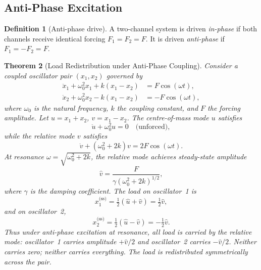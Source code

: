 \documentclass[12pt,a4paper]{article}
\theoremstyle{plain}
\newtheorem{theorem}{Theorem}[section]
\theoremstyle{definition}
\newtheorem{definition}[theorem]{Definition}
\theoremstyle{remark}
\begin{document}
\subsection{Anti-Phase Excitation}

\begin{definition}[Anti-phase drive]
A two-channel system is driven \emph{in-phase} if both channels receive
identical forcing $F_1 = F_2 = F$.  It is driven \emph{anti-phase} if
$F_1 = -F_2 = F$.
\end{definition}

\begin{theorem}[Load Redistribution under Anti-Phase Coupling]
\label{thm:lac}
Consider a coupled oscillator pair $(x_1, x_2)$ governed by
\begin{align}
\ddot x_1 + \omega_0^2 x_1 + k(x_1 - x_2) &= F\cos(\omega t), \\
\ddot x_2 + \omega_0^2 x_2 - k(x_1 - x_2) &= -F\cos(\omega t),
\end{align}
where $\omega_0$ is the natural frequency, $k$ the coupling constant,
and $F$ the forcing amplitude.  Let $u = x_1 + x_2$, $v = x_1 - x_2$.
The centre-of-mass mode $u$ satisfies
\begin{equation}
\ddot u + \omega_0^2 u = 0 \quad\text{(unforced)},
\end{equation}
while the relative mode $v$ satisfies
\begin{equation}
\ddot v + (\omega_0^2 + 2k) v = 2F\cos(\omega t).
\end{equation}
At resonance $\omega = \sqrt{\omega_0^2 + 2k}$, the relative mode
achieves steady-state amplitude
\begin{equation}
\hat v = \frac{F}{\gamma(\omega_0^2 + 2k)^{1/2}},
\end{equation}
where $\gamma$ is the damping coefficient.
The load on oscillator~1 is
\begin{equation}
x_1^{\text{(ss)}} = \tfrac{1}{2}(\hat u + \hat v)
= \tfrac{1}{2}\hat v,
\end{equation}
and on oscillator~2,
\begin{equation}
x_2^{\text{(ss)}} = \tfrac{1}{2}(\hat u - \hat v)
= -\tfrac{1}{2}\hat v.
\end{equation}
Thus under anti-phase excitation at resonance, \emph{all load is
carried by the relative mode}: oscillator~1 carries amplitude
$+\hat v/2$ and oscillator~2 carries $-\hat v/2$.  Neither carries
zero; neither carries everything.  The load is \emph{redistributed
symmetrically} across the pair.
\end{theorem}
\end{document}

